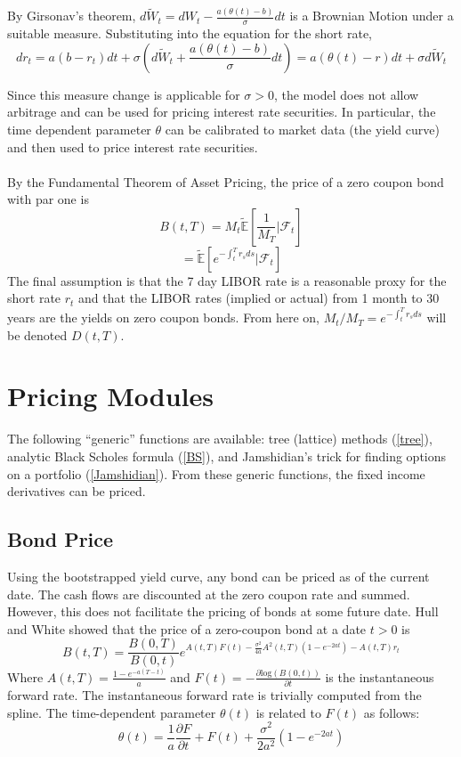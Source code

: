 \documentclass{article}
\theoremstyle{definition}
\begin{document}
By Girsonav's theorem, \(d\tilde{W}_t=dW_t-\frac{a(\theta(t)-b)}{\sigma}dt\) is a Brownian Motion under a suitable measure.  Substituting into the equation for the short rate,
\[dr_t=a(b-r_t)dt+\sigma\left(d\tilde{W}_t+\frac{a(\theta(t)-b)}{\sigma}dt\right)=a(\theta(t)-r)dt+\sigma d\tilde{W}_t\]

Since this measure change is applicable for \(\sigma>0\), the model does not allow arbitrage and can be used for pricing interest rate securities. In particular, the time dependent parameter \(\theta\) can be calibrated to market data (the yield curve) and then used to price interest rate securities.
\\
\\
By the Fundamental Theorem of Asset Pricing, the price of a zero coupon bond with par one is \[B(t, T)=M_t\mathbb{\tilde{E}}\left[\frac{1}{M_T}|\mathcal{F}_t \right]\] \[=\mathbb{\tilde{E}}\left[e^{-\int_t ^ T r_s ds}|\mathcal{F}_t \right]\]  The final assumption is that the 7 day LIBOR rate is a reasonable proxy for the short rate \(r_t\) and that the LIBOR rates (implied or actual) from 1 month to 30 years are the yields on zero coupon bonds.  From here on, \(M_t/M_T=e^{-\int_t ^ T r_s ds}\) will be denoted \(D(t, T)\).


\section{Pricing Modules}
The following ``generic'' functions are available: tree (lattice) methods (\ref{tree}), analytic Black Scholes formula (\ref{BS}), and Jamshidian's trick for finding options on a portfolio (\ref{Jamshidian}). From these generic functions, the fixed income derivatives can be priced.


\subsection{Bond Price}

Using the bootstrapped yield curve, any bond can be priced as of the current date.  The cash flows are discounted at the zero coupon rate and summed.  However, this does not facilitate the pricing of bonds at some future date.  Hull and White showed that the price of a zero-coupon bond at a date \(t>0\) is
\[B(t, T)=\frac{B(0, T)}{B(0, t)}e^{A(t, T)F(t)-\frac{\sigma^2}{4a}A^2 (t, T)\left(1-e^{-2at}\right)-A(t, T)r_t}\]
Where \(A(t, T)=\frac{1-e^{-a(T-t)}}{a}\) and \(F(t)=-\frac{\partial \mathrm{log}(B(0, t))}{\partial t}\) is the instantaneous forward rate. The instantaneous forward rate is trivially computed from the spline. The time-dependent parameter \(\theta(t)\) is related to \(F(t)\) as follows:\[\theta(t)=\frac{1}{a} \frac{\partial F}{\partial t}+F(t)+\frac{\sigma^2}{2a^2}\left(1-e^{-2at}\right)\]
\end{document}
